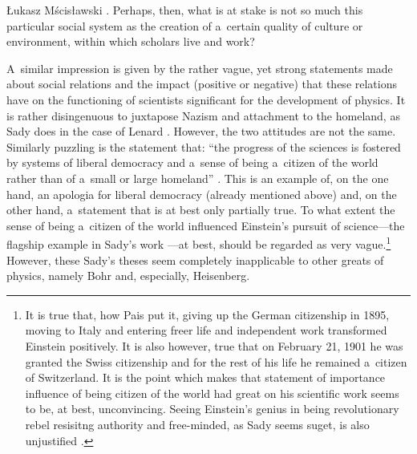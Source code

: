 \begin{newrevengenv}{Łukasz Mścisławski}
{%
\parencite[][pp.185-202.]{russo_forgotten_2004}.%
} Perhaps, then, what is at stake is not so much this particular social system as the creation of a~certain quality of culture or environment, within which scholars live and work?

A~similar impression is given by the rather vague, yet strong statements made about social relations and the impact (positive or negative) that these relations have on the functioning of scientists significant for the development of physics. It is rather disingenuous to juxtapose Nazism and attachment to the homeland, as Sady does in the case of Lenard
\parencite[][p.154]{sady_struktura_2020}. %
 However, the two attitudes are not the same. Similarly puzzling is the statement that: ``the progress of the sciences is fostered by systems of liberal democracy and a~sense of being a~citizen of the world rather than of a~small or large homeland'' 
\parencite[][p.154]{sady_struktura_2020}. %
 This is an example of, on the one hand, an apologia for liberal democracy (already mentioned above) and, on the other hand, a~statement that is at best only partially true. To what extent the sense of being a~citizen of the world influenced Einstein's pursuit of science---the flagship example in Sady's work 
\parencite*[][p.117]{sady_struktura_2020}---at best, should be regarded as very vague.\footnote{It is true that, how Pais put it, giving up the German citizenship in 1895, moving to Italy and entering freer life and independent work transformed Einstein positively. It is also however, true that on February 21, 1901 he was granted the Swiss citizenship and for the rest of his life he remained a~citizen of Switzerland. It is the point which makes that statement of importance influence of being citizen of the world had great on his scientific work seems to be, at best, unconvincing. Seeing Einstein's genius in being revolutionary rebel resisitng authority and free-minded, as Sady seems suget, is also unjustified  
\parencite[cf.][pp.38--45]{pais_subtle_2005}.%
} However, these Sady's theses seem completely inapplicable to other greats of physics, namely Bohr and, especially, Heisenberg.


\end{newrevengenv}
